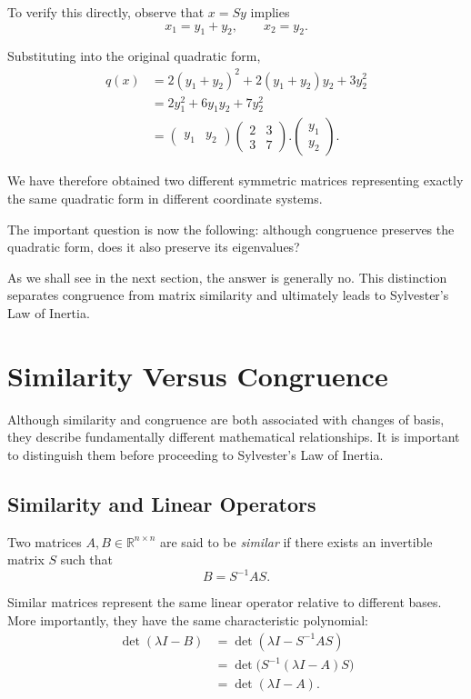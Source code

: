 \documentclass[11pt]{article}
\theoremstyle{definition}
\theoremstyle{remark}
\begin{document}
To verify this directly, observe that $x=Sy$
implies
\[
    x_1=y_1+y_2,
    \qquad
    x_2=y_2.
\]

Substituting into the original quadratic form,
\[
\begin{aligned}
    q(x)
    &=2(y_1+y_2)^2
      +2(y_1+y_2)y_2+3y_2^2\\
    &=2y_1^2+6y_1y_2+7y_2^2\\
    &=
    \begin{pmatrix}y_1&y_2\end{pmatrix}
     \boxed{
    \begin{pmatrix}
        2&3\\
        3&7
    \end{pmatrix}}.
    \begin{pmatrix}y_1\\y_2\end{pmatrix}.
\end{aligned}
\]

We have therefore obtained two different
symmetric matrices representing exactly the
same quadratic form in different coordinate
systems.

The important question is now the following:
although congruence preserves the quadratic
form, does it also preserve its eigenvalues?

As we shall see in the next section, the
answer is generally no. This distinction
separates congruence from matrix similarity
and ultimately leads to Sylvester's Law
of Inertia.


\section{Similarity Versus Congruence}

Although similarity and congruence are both associated
with changes of basis, they describe fundamentally
different mathematical relationships. It is important
to distinguish them before proceeding to Sylvester's
Law of Inertia.

\subsection{Similarity and Linear Operators}

Two matrices $A,B\in\mathbb{R}^{n\times n}$ are
said to be \emph{similar} if there exists an
invertible matrix $S$ such that
\[
    B=S^{-1}AS.
\]

Similar matrices represent the same linear operator
relative to different bases. More importantly,
they have the same characteristic polynomial:
\[
\begin{aligned}
\det(\lambda I-B)
&=\det(\lambda I-S^{-1}AS)\\
&=\det\bigl(S^{-1}(\lambda I-A)S\bigr)\\
&=\det(\lambda I-A).
\end{aligned}
\]
\end{document}
